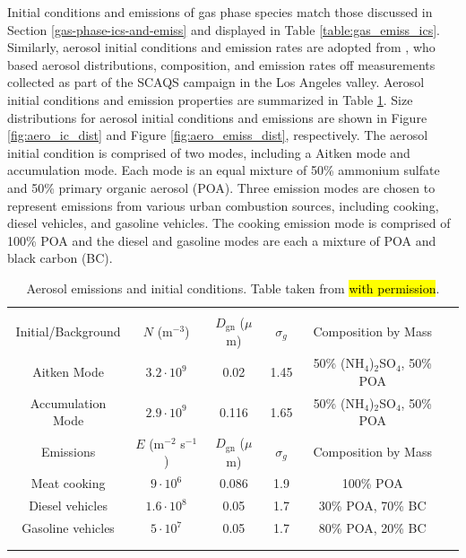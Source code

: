 Initial conditions and emissions of gas phase species match those discussed in Section \ref{gas-phase-ics-and-emiss} and displayed in Table \ref{table:gas_emiss_ics}. Similarly, aerosol initial conditions and emission rates are adopted from \cite{riemer_simulating_2009}, who based aerosol distributions, composition, and emission rates off measurements collected as part of the SCAQS campaign in the Los Angeles valley. Aerosol initial conditions and emission properties are summarized in Table \ref{table:aero_emiss_ics}. Size distributions for aerosol initial conditions and emissions are shown in Figure \ref{fig:aero_ic_dist} and Figure \ref{fig:aero_emiss_dist}, respectively. The aerosol initial condition is comprised of two modes, including a Aitken mode and accumulation mode. Each mode is an equal mixture of 50\% ammonium sulfate and 50\% primary organic aerosol (POA). Three emission modes are chosen to represent emissions from various urban combustion sources, including cooking, diesel vehicles, and gasoline vehicles. The cooking emission mode is comprised of 100\% POA and the diesel and gasoline modes are each a mixture of POA and black carbon (BC). 

\begin{table}[h]
\centering
\caption{Aerosol emissions and initial conditions. Table taken from \cite{riemer_simulating_2009} \hl{with permission}.}
\begin{tabular*}{\linewidth}{@{\extracolsep{\fill}} cccccc}
\\[-2ex]\hline 
     \hline \\[-2ex] Initial/Background  & $N$ (m$^{-3}$) & $D_{\text{gn}}$ ($\mu$m) & $\sigma_g$ & Composition by Mass\\
 \midrule
Aitken Mode & $3.2 \cdot 10^9$ & 0.02 & 1.45 & 50\% (NH$_4$)$_2$SO$_4$, 50\% POA\\
Accumulation Mode & $2.9 \cdot 10^9$ & 0.116 & 1.65 & 50\% (NH$_4$)$_2$SO$_4$, 50\% POA\\
\midrule
Emissions & $E$ (m$^{-2}$ s$^{-1}$) & $D_{\text{gn}}$ ($\mu$m) & $\sigma_g$ & Composition by Mass\\
\midrule
Meat cooking & $9 \cdot 10^6$ & 0.086 & 1.9 & 100\% POA\\
Diesel vehicles & $1.6 \cdot 10^8$ & 0.05 & 1.7 & 30\% POA, 70\% BC \\
Gasoline vehicles & $5 \cdot 10^7$ & 0.05 & 1.7 & 80\% POA, 20\% BC \\
\\[-2ex]\hline 
     \hline \\[-2ex]
\end{tabular*}
\label{table:aero_emiss_ics}
\end{table}

